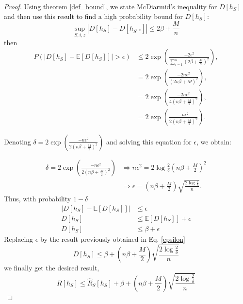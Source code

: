 \documentclass{article}
\begin{document}
\begin{proof}
Using theorem \ref{def_bound}, we state McDiarmid's inequality for $D[h_S]$ and then use this result to find a high probability bound for $D[h_S]$:
\begin{equation}
\sup_{S, i, z} |D[h_S] - D[h_{S^{i, z}}]| \leq 2\beta + \frac{M}{n}
\end{equation}
then 
\begin{equation}
\begin{split}
P(|D[h_S] - \mathbb{E}[D[h_S]]| > \epsilon) & \leq 2\exp \left(\frac{-2\epsilon^2}{\sum_{i=1}^{n}  \left( 2\beta + \frac{M}{n} \right)^2 } \right), \\
& = 2\exp \left(\frac{-2n\epsilon^2}{\left( 2n\beta + M \right)^2 } \right), \\
& = 2\exp \left(\frac{-2n\epsilon^2}{4\left(n\beta + \frac{M}{2} \right)^2 } \right), \\
& = 2\exp \left(\frac{-n\epsilon^2}{2\left(n\beta + \frac{M}{2} \right)^2 } \right).
\end{split}
\end{equation}

Denoting $\delta = 2\exp \left(\frac{-n\epsilon^2}{2\left(n\beta + \frac{M}{2} \right)^2 } \right)$ and solving this equation for $\epsilon$, we obtain:

\begin{equation}\label{epsilon}
\begin{split}
\delta = 2\exp \left(\frac{-n\epsilon^2}{2\left(n\beta + \frac{M}{2} \right)^2 } \right) & \Rightarrow n\epsilon^2 = 2\log\frac{2}{\delta}\left(n\beta + \frac{M}{2} \right)^2 \\
& \Rightarrow \epsilon = \left(n\beta + \frac{M}{2} \right) \sqrt{\frac{2\log\frac{2}{\delta}}{n}}.
\end{split}
\end{equation}
Thus, with probability $1-\delta$ 
\begin{equation*}
\begin{split}
|D[h_S] - \mathbb{E}[D[h_S]]| &\leq \epsilon \\
D[h_S] &\leq \mathbb{E}[D[h_S]] + \epsilon \\
D[h_S] &\leq \beta + \epsilon
\end{split}
\end{equation*}
Replacing $\epsilon$ by the result previously obtained in Eq. \ref{epsilon}
\begin{equation}
D[h_S] \leq \beta + \left(n\beta + \frac{M}{2} \right) \sqrt{\frac{2\log\frac{2}{\delta}}{n}}
\end{equation}
we finally get the desired result,
\begin{equation}
R[h_S] \leq \hat{R}_S[h_S] + \beta + \left(n\beta + \frac{M}{2} \right) \sqrt{\frac{2\log\frac{2}{\delta}}{n}}
\end{equation}
\end{proof}
\end{document}
